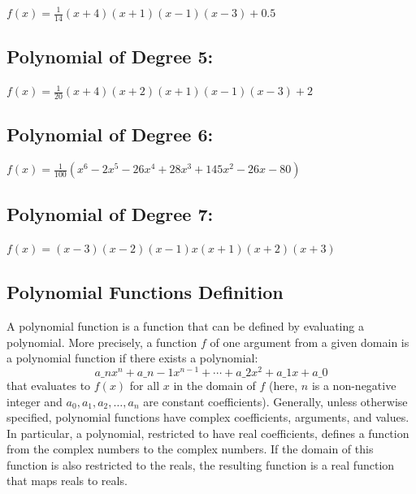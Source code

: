 $
f(x) = \frac{1}{14} (x + 4)(x + 1)(x - 1)(x - 3) + 0.5
$

\subsection{Polynomial of Degree 5:}
\label{sss:poly-a79e}

$
f(x) = \frac{1}{20} (x + 4)(x + 2)(x + 1)(x - 1)(x - 3) + 2
$

\subsection{Polynomial of Degree 6:}
\label{sss:poly-2daf}

$
f(x) = \frac{1}{100} (x^6 - 2x^5 - 26x^4 + 28x^3 + 145x^2 - 26x - 80)
$

\subsection{Polynomial of Degree 7:}
\label{sss:poly-6100}

$
f(x) = (x - 3)(x - 2)(x - 1)x(x + 1)(x + 2)(x + 3)
$

\subsection{Polynomial Functions Definition}
\label{sss:poly-1269}

A polynomial function is a function that can be defined by evaluating a polynomial. More precisely, a function $f$ of one argument from a given domain is a polynomial function if there exists a polynomial:
\[
a\_n x^n + a\_{n-1} x^{n-1} + \cdots + a\_2 x^2 + a\_1 x + a\_0
\]
that evaluates to $f(x)$ for all $x$ in the domain of $f$ (here, $n$ is a non-negative integer and $a_0, a_1, a_2, \ldots, a_n$ are constant coefficients). Generally, unless otherwise specified, polynomial functions have complex coefficients, arguments, and values. In particular, a polynomial, restricted to have real coefficients, defines a function from the complex numbers to the complex numbers. If the domain of this function is also restricted to the reals, the resulting function is a real function that maps reals to reals.

